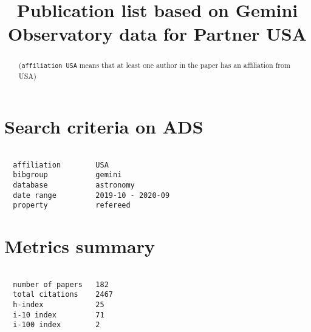 \documentclass[twocolumn,linenumbers]{aastex631}
\begin{document}
\title{Publication list based on Gemini Observatory data for Partner USA}

\begin{abstract}

(\texttt{affiliation USA} means that at least one author in the paper has an affiliation from USA)

\end{abstract}

\section*{Search criteria on ADS}

\begin{verbatim}

  affiliation        USA
  bibgroup           gemini
  database           astronomy
  date range         2019-10 - 2020-09
  property           refereed

\end{verbatim}

\vspace{3.0cm}

\section*{Metrics summary}

\begin{verbatim}

  number of papers   182
  total citations    2467
  h-index            25
  i-10 index         71
  i-100 index        2

\end{verbatim}

\nocite{*}


\end{document}
